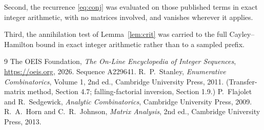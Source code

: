 \documentclass[11pt,a4paper]{article}
\theoremstyle{plain}
\theoremstyle{definition}
\begin{document}
Second, the recurrence \eqref{eq:conj} was evaluated on those published terms in exact
integer arithmetic, with no matrices involved, and vanishes wherever it applies.

Third, the annihilation test of Lemma~\ref{lem:crit} was carried to the full
Cayley--Hamilton bound in exact integer arithmetic rather than to a sampled prefix.

\begin{thebibliography}{9}
 The OEIS Foundation, \emph{The On-Line Encyclopedia of Integer
Sequences}, \url{https://oeis.org}, 2026. Sequence A229641.
 R.~P.~Stanley, \emph{Enumerative Combinatorics}, Volume 1, 2nd ed.,
Cambridge University Press, 2011. (Transfer-matrix method, Section 4.7; falling-factorial
inversion, Section 1.9.)
 P.~Flajolet and R.~Sedgewick, \emph{Analytic Combinatorics}, Cambridge
University Press, 2009.
 R.~A.~Horn and C.~R.~Johnson, \emph{Matrix Analysis}, 2nd ed., Cambridge
University Press, 2013.
\end{thebibliography}
\end{document}
